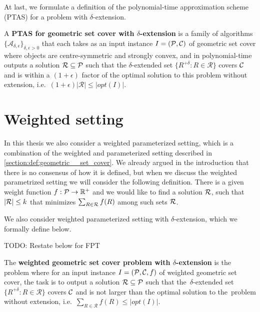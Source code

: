 At last, we formulate a definition of the
polynomial-time approximation scheme (PTAS)
for a problem with $\delta$-extension.

\begin{defi}
A \textbf{PTAS for geometric set cover 
with $\delta$-extension} is a family of algorithms
$\{\mathcal{A}_{\delta, \epsilon}\}_{\delta, \epsilon > 0}$ that
each takes as an input instance $I=(\mathcal{P}, \mathcal{C})$
of geometric set cover where objects are centre-symmetric and strongly convex,
and in polynomial-time outputs a solution $\mathcal{R} \subseteq \mathcal{P}$
such that the $\delta$-extended set
$\{ R^{+\delta} :  R \in \mathcal{R} \}$ covers $\mathcal{C}$
and is within a $(1+\epsilon)$ factor of the optimal
solution to this problem without
extension, i.e.~$(1+\epsilon)|\mathcal{R}| \le |opt(I)|$.
\end{defi}

\section{Weighted setting}

In this thesis we also consider a weighted parameterized setting,
which is a combination
of the weighted and parameterized setting described in 
\ref{section:def:geometric__set_cover}.
We already argued in the introduction
that there is no consensus of how it is defined, but when we discuss the
weighted parametrized setting we will consider the following
definition. There is a given weight function
$f : \mathcal{P} \rightarrow \mathbb{R^+}$
and we would like to find a solution $\mathcal{R}$,
such that $|\mathcal{R}| \le k$
that minimizes $\sum_{R \in \mathcal{R}} f(R)$ among such sets $\mathcal{R}$.

We also consider weighted parameterized setting with $\delta$-extension,
which we formally define below.

TODO: Restate below for FPT
\begin{defi}
The \textbf{weighted geometric set cover problem
with $\delta$-extension} is the problem where for an input instance
$I=(\mathcal{P}, \mathcal{C}, f)$ of weighted geometric set cover,
the task is to output a solution $\mathcal{R} \subseteq \mathcal{P}$
such that the~$\delta$-extended set
$\{ R^{+\delta} :  R \in \mathcal{R} \}$ covers $\mathcal{C}$
and is not larger than the optimal solution to the~problem without
extension, i.e.~$\sum_{R \in \mathcal{R}} f(R) \le |opt(I)|$.
\end{defi}

